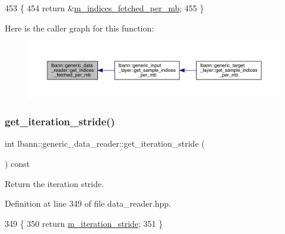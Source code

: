 \begin{DoxyCode}
453                                                 \{
454     \textcolor{keywordflow}{return} &\hyperlink{classlbann_1_1generic__data__reader_a4ee1a159c74561c15a5e0c267ad3cc6a}{m\_indices\_fetched\_per\_mb};
455   \}
\end{DoxyCode}
Here is the caller graph for this function\+:\nopagebreak
\begin{figure}[H]
\begin{center}
\leavevmode
\includegraphics[width=350pt]{classlbann_1_1generic__data__reader_a8d8b44ed55e2af49c70d29277ff57a91_icgraph}
\end{center}
\end{figure}
\mbox{\label{classlbann_1_1generic__data__reader_ac84ecef4f72f209420279526e3e6c77b}} 
\subsubsection{\texorpdfstring{get\+\_\+iteration\+\_\+stride()}{get\_iteration\_stride()}}
{\footnotesize\ttfamily int lbann\+::generic\+\_\+data\+\_\+reader\+::get\+\_\+iteration\+\_\+stride (\begin{DoxyParamCaption}{ }\end{DoxyParamCaption}) const\hspace{0.3cm}{\ttfamily [inline]}}



Return the iteration stride. 



Definition at line 349 of file data\+\_\+reader.\+hpp.


\begin{DoxyCode}
349                                    \{
350     \textcolor{keywordflow}{return} \hyperlink{classlbann_1_1generic__data__reader_a73b23a2e7768db4e9e8ba4d9a362163a}{m\_iteration\_stride};
351   \}
\end{DoxyCode}
\mbox{\label{classlbann_1_1generic__data__reader_af0f82d719fcd6e0668414836f2673d5c}} 
